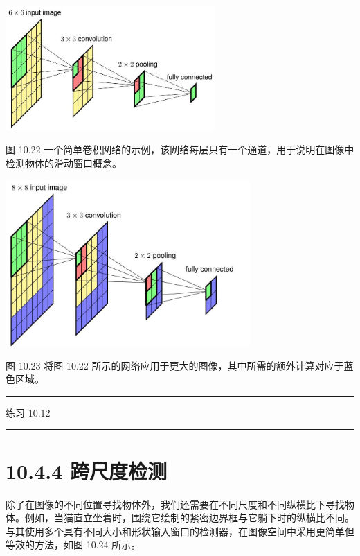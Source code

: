 \documentclass[10pt]{article}
\newcommand{\HRule}{\begin{center}\rule{0.9\linewidth}{0.2mm}\end{center}}
\begin{document}
\begin{center}
\includegraphics[max width=0.6\textwidth]{images/0194e279-9b28-703a-88f4-c3ac21e2010d_331_710_1517_836_497_0.jpg}
\end{center}
\hspace*{3em} 

图 10.22 一个简单卷积网络的示例，该网络每层只有一个通道，用于说明在图像中检测物体的滑动窗口概念。

\begin{center}
\includegraphics[max width=0.7\textwidth]{images/0194e279-9b28-703a-88f4-c3ac21e2010d_332_592_351_925_628_0.jpg}
\end{center}
\hspace*{3em} 

图 10.23 将图 10.22 所示的网络应用于更大的图像，其中所需的额外计算对应于蓝色区域。

\HRule

练习 10.12

\HRule

\section*{10.4.4 跨尺度检测}

除了在图像的不同位置寻找物体外，我们还需要在不同尺度和不同纵横比下寻找物体。例如，当猫直立坐着时，围绕它绘制的紧密边界框与它躺下时的纵横比不同。与其使用多个具有不同大小和形状输入窗口的检测器，在图像空间中采用更简单但等效的方法，如图 10.24 所示。
\end{document}
